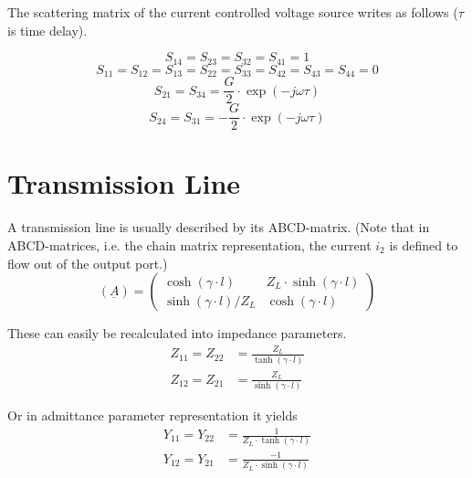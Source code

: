 The scattering matrix of the current controlled voltage source
writes as follows ($\tau$ is time delay).

\begin{equation}
S_{14} = S_{23} = S_{32} = S_{41} = 1
\end{equation}
\begin{equation}
S_{11} = S_{12} = S_{13} = S_{22} = S_{33} = S_{42} = S_{43} = S_{44} = 0
\end{equation}
\begin{equation}
S_{21} = S_{34} = \frac{G}{2}\cdot \exp\left(-j\omega\tau\right)
\end{equation}
\begin{equation}
S_{24} = S_{31} = -\frac{G}{2}\cdot \exp\left(-j\omega\tau\right)
\end{equation}


\section{Transmission Line}
\label{sec:tl_yparameter}

A transmission line is usually described by its ABCD-matrix.  (Note
that in ABCD-matrices, i.e. the chain matrix representation, the
current $i_2$ is defined to flow out of the output port.)
\begin{equation}
\label{eq:tl_apara}
\left(\underline{A}\right) =
\begin{pmatrix}
\cosh{\left(\gamma\cdot l\right)} & Z_L\cdot \sinh{\left(\gamma\cdot l\right)}\\
\sinh{\left(\gamma\cdot l\right)} / Z_L & \cosh{\left(\gamma\cdot l\right)}
\end{pmatrix}
\end{equation}

These can easily be recalculated into impedance parameters.
\begin{align}
Z_{11} = Z_{22} &= \frac{Z_L}{\tanh{\left(\gamma\cdot l\right)}}\\
Z_{12} = Z_{21} &= \frac{Z_L}{\sinh{\left(\gamma\cdot l\right)}}
\end{align}

Or in admittance parameter representation it yields
\begin{equation}
\label{eq:TransLineY}
\begin{split}
Y_{11} = Y_{22} &= \frac{1}{Z_L \cdot \tanh{\left(\gamma\cdot l\right)}}\\
Y_{12} = Y_{21} &= \frac{-1}{Z_L\cdot \sinh{\left(\gamma\cdot l\right)}}
\end{split}
\end{equation}

